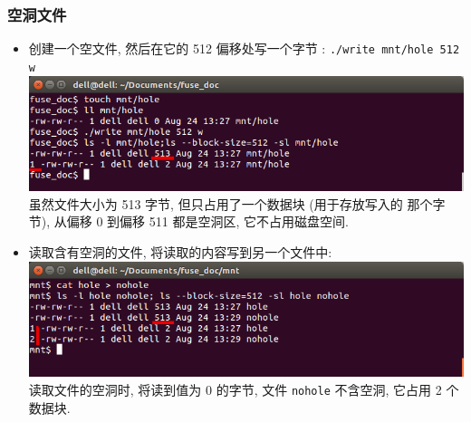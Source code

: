 \documentclass[nofonts, titlepage]{ctexart}
\begin{document}
\subsubsection{空洞文件}
\begin{itemize}
    \item 创建一个空文件, 然后在它的 512 偏移处写一个字节 : 
        \verb'./write mnt/hole 512 w' \\
        \includegraphics[width=14cm]{./images/./hole_t1.png} \\
        虽然文件大小为 513 字节, 但只占用了一个数据块 (用于存放写入的
        那个字节), 从偏移 0 到偏移 511 都是空洞区, 它不占用磁盘空间.
    \item 读取含有空洞的文件, 将读取的内容写到另一个文件中: \\
        \includegraphics[width=14cm]{./images/./hole_t2.png}\\
        读取文件的空洞时, 将读到值为 0 的字节, 文件 \verb'nohole' 不含空洞,
        它占用 2 个数据块.
\end{itemize}
\end{document}
